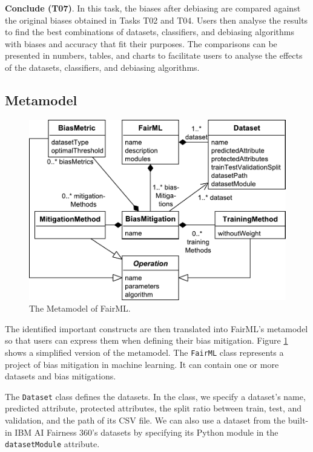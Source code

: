 \documentclass[sigconf,review]{acmart}
\begin{document}
	\textbf{Conclude (T07)}. In this task, the biases after debiasing are compared against the original biases obtained in Tasks T02 and T04. Users then analyse the results to find the best combinations of datasets, classifiers, and debiasing algorithms with biases and accuracy that fit their purposes. The comparisons can be presented in numbers, tables, and charts to facilitate users to analyse the effects of the datasets, classifiers, and debiasing algorithms. 
	
	\subsection{Metamodel}
	\label{sec:metamodel}
	
	\begin{figure}
		\includegraphics[width=\linewidth]{figures/metamodel}
		\caption{The Metamodel of FairML.}
		\label{fig:metamodel}
	\end{figure}
	
	The identified important constructs are then translated into FairML's metamodel so that users can express them when defining their bias mitigation. Figure \ref{fig:metamodel} shows a simplified version of the metamodel. The \texttt{FairML} class represents a project of bias mitigation in machine learning. It can contain one or more datasets and bias mitigations. 
	
	The \texttt{Dataset} class defines the datasets. In the class, we specify a dataset's name, predicted attribute, protected attributes, the split ratio between train, test, and validation, and the path of its CSV file. We can also use a dataset from the built-in IBM AI Fairness 360's datasets by specifying its Python module in the \texttt{datasetModule} attribute.
	
\end{document}
